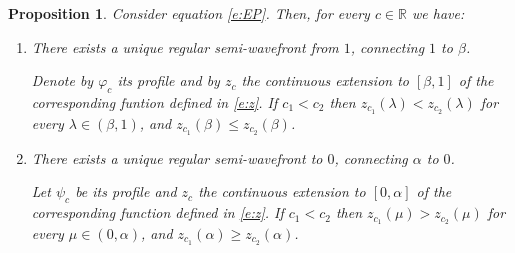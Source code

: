\documentclass[11pt,a4paper]{article}
\newcommand{\R}{\mathbb R}
\newtheorem{proposition}{Proposition}[section]
\renewcommand{\phi}{\varphi}
\begin{document}
\begin{proposition}\label{p:twins}
Consider equation \eqref{e:EP}. Then, for every $c\in\R$ we have:
\begin{enumerate}[label=(\arabic*)]
\item There exists a unique regular semi-wavefront from $1$, connecting $1$ to $\beta$.

Denote by $\phi_c$ its profile and by $z_c$ the continuous extension to $[\beta,1]$ of the corresponding funtion defined in \eqref{e:z}.  If $c_1 < c_2$ then $z_{c_1}(\lambda) < z_{c_2}(\lambda)$ for every $\lambda \in (\beta, 1)$, and $z_{c_1}(\beta) \le z_{c_2}(\beta)$.

  \item There exists a unique regular semi-wavefront to $0$, connecting $\alpha$ to $0$.

Let $\psi_c$ be its profile and $z_c$ the continuous extension to $[0,\alpha]$ of the corresponding function defined in \eqref{e:z}. If $c_1 < c_2$ then $z_{c_1}(\mu) > z_{c_2}(\mu)$ for every $\mu \in (0,\alpha)$, and $z_{c_1}(\alpha)\ge z_{c_2}(\alpha)$.
\end{enumerate}
\end{proposition}
\end{document}
